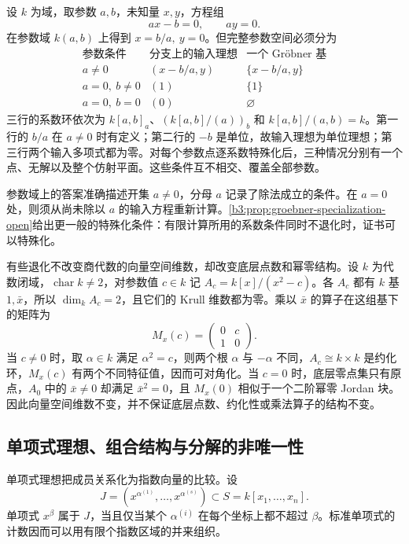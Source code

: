 \begin{example}\label{b3:exm:B-parameter-branches}
	设 \(k\) 为域，取参数 \(a,b\)，未知量 \(x,y\)，方程组
	\[
		ax-b=0,\qquad ay=0.
	\]
	在参数域 \(k(a,b)\) 上得到 \(x=b/a,\ y=0\)。但完整参数空间必须分为
	\[
		\begin{array}{c|c|c}
			\text{参数条件}&\text{分支上的输入理想}&\text{一个 Gröbner 基}\\ \hline a\ne0&(x-b/a,y)&\{x-b/a,y\}\\
			a=0,\ b\ne0&(1)&\{1\}\\
			a=0,\ b=0&(0)&\varnothing
		\end{array}
	\]
	三行的系数环依次为 \(k[a,b]_a\)、\((k[a,b]/(a))_b\) 和 \(k[a,b]/(a,b)=k\)。第一行的 \(b/a\) 在 \(a\ne0\) 时有定义；第二行的 \(-b\) 是单位，故输入理想为单位理想；第三行两个输入多项式都为零。对每个参数点逐系数特殊化后，三种情况分别有一个点、无解以及整个仿射平面。这些条件互不相交、覆盖全部参数。
\end{example}

参数域上的答案准确描述开集 \(a\ne0\)，分母 \(a\) 记录了除法成立的条件。在 \(a=0\) 处，则须从尚未除以 \(a\) 的输入方程重新计算。\cref{b3:prop:groebner-specialization-open}给出更一般的特殊化条件：有限计算所用的系数条件同时不退化时，证书可以特殊化。

\ProseParagraphBreak
有些退化不改变商代数的向量空间维数，却改变底层点数和幂零结构。设 \(k\) 为代数闭域，\(\operatorname{char}k\ne2\)，对参数值 \(c\in k\) 记 \(A_c=k[x]/(x^2-c)\)。各 \(A_c\) 都有 \(k\) 基 \(1,\bar x\)，所以 \(\dim_kA_c=2\)，且它们的 Krull 维数都为零。乘以 \(\bar x\) 的算子在这组基下的矩阵为
\[
	M_x(c)=\begin{pmatrix}0&c\\1&0\end{pmatrix}.
\]
当 \(c\ne0\) 时，取 \(\alpha\in k\) 满足 \(\alpha^2=c\)，则两个根 \(\alpha\) 与 \(-\alpha\) 不同，\(A_c\cong k\times k\) 是约化环，\(M_x(c)\) 有两个不同特征值，因而可对角化。当 \(c=0\) 时，底层零点集只有原点，\(A_0\) 中的 \(\bar x\ne0\) 却满足 \(\bar x^2=0\)，且 \(M_x(0)\) 相似于一个二阶幂零 Jordan 块。因此向量空间维数不变，并不保证底层点数、约化性或乘法算子的结构不变。

\subsection{单项式理想、组合结构与分解的非唯一性}
\label{b3:subsec:B03:04}

单项式理想把成员关系化为指数向量的比较。设
\[
	J=(x^{\alpha^{(1)}},\ldots,x^{\alpha^{(s)}})\subset S=k[x_1,\ldots,x_n].
\]
单项式 \(x^\beta\) 属于 \(J\)，当且仅当某个 \(\alpha^{(i)}\) 在每个坐标上都不超过 \(\beta\)。标准单项式的计数因而可以用有限个指数区域的并来组织。

